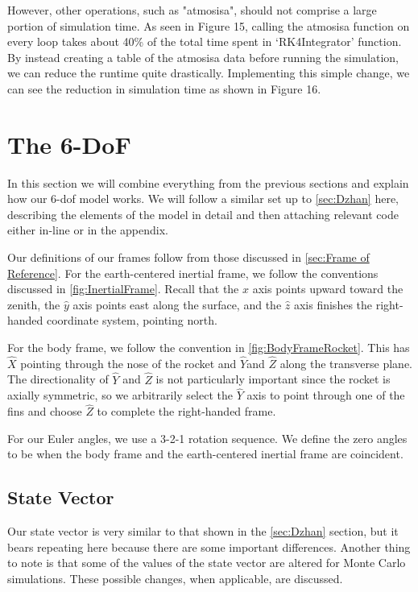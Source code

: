 \documentclass[12pt]{report}
\begin{document}
However, other operations, such as "atmosisa", should not comprise a large portion of simulation time. As seen in Figure 15, calling the atmosisa function on every loop takes about 40\% of the total time spent in ‘RK4Integrator’ function. By instead creating a table of the atmosisa data before running the simulation, we can reduce the runtime quite drastically. Implementing this simple change, we can see the reduction in simulation time as shown in Figure 16.



\chapter{The 6-DoF}
In this section we will combine everything from the previous sections and explain how our 6-\gls{dof} model works. We will follow a similar set up to \ref{sec:Dzhan}  here, describing the elements of the model in detail and then attaching relevant code either in-line or in the appendix.

Our definitions of our frames follow from those discussed in \ref{sec:Frame of Reference}. For the earth-centered inertial frame, we follow the conventions discussed in \ref{fig:InertialFrame}. Recall that the $\hat{x}$ axis points upward toward the zenith, the $\hat{y}$ axis points east along the surface, and the $\hat{z}$ axis finishes the right-handed coordinate system, pointing north.

For the body frame, we follow the convention in \ref{fig:BodyFrameRocket}. This has $\hat{X}$ pointing through the nose of the rocket and $\hat{Y}$and $\hat{Z}$ along the transverse plane. The directionality of $\hat{Y}$ and $\hat{Z}$ is not particularly important since the rocket is axially symmetric, so we arbitrarily select the $\hat{Y}$ axis to point through one of the fins and choose $\hat{Z}$ to complete the right-handed frame.

For our \gls{Euler angles}, we use a 3-2-1 rotation sequence. We define the zero angles to be when the body frame and the earth-centered inertial frame are coincident.
\section{State Vector}
Our \gls{state vector} is very similar to that shown in the \ref{sec:Dzhan} section, but it bears repeating here because there are some important differences. Another thing to note is that some of the values of the \gls{state vector} are altered for Monte Carlo simulations. These possible changes, when applicable, are discussed.
\end{document}
